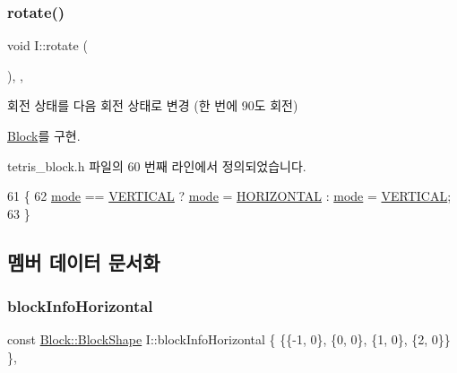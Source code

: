 \subsubsection{\texorpdfstring{rotate()}{rotate()}}
{\footnotesize\ttfamily void I\+::rotate (\begin{DoxyParamCaption}{ }\end{DoxyParamCaption})\hspace{0.3cm}{\ttfamily [inline]}, {\ttfamily [override]}, {\ttfamily [virtual]}}



회전 상태를 다음 회전 상태로 변경 (한 번에 90도 회전) 



\mbox{\hyperlink{class_block_af1499ad7e48fb750581b471d0d5bb0e0}{Block}}를 구현.



tetris\+\_\+block.\+h 파일의 60 번째 라인에서 정의되었습니다.


\begin{DoxyCode}
61     \{
62         \mbox{\hyperlink{class_i_a97884fed99bc779803178b5c3f4bc02d}{mode}} == \mbox{\hyperlink{class_block_a33a96023993478ad4b52426188454765a76628d7877667ccb2f6e549b89466a4a}{VERTICAL}} ? \mbox{\hyperlink{class_i_a97884fed99bc779803178b5c3f4bc02d}{mode}} = \mbox{\hyperlink{class_block_a33a96023993478ad4b52426188454765a883bda1b4a0cb6d25d8b3c3465f0cfef}{HORIZONTAL}} : \mbox{\hyperlink{class_i_a97884fed99bc779803178b5c3f4bc02d}{mode}} = 
      \mbox{\hyperlink{class_block_a33a96023993478ad4b52426188454765a76628d7877667ccb2f6e549b89466a4a}{VERTICAL}};
63     \}
\end{DoxyCode}


\subsection{멤버 데이터 문서화}
\mbox{\label{class_i_af8e5eabbd3a5e1fef9066d3a6fa44adc}} 
\subsubsection{\texorpdfstring{block\+Info\+Horizontal}{blockInfoHorizontal}}
{\footnotesize\ttfamily const \mbox{\hyperlink{class_block_aca5d951639f113e2ebd7856209d6b9ab}{Block\+::\+Block\+Shape}} I\+::block\+Info\+Horizontal \{ \{\{-\/1, 0\}, \{0, 0\}, \{1, 0\}, \{2, 0\}\} \}\hspace{0.3cm}{\ttfamily [static]}, {\ttfamily [private]}}



